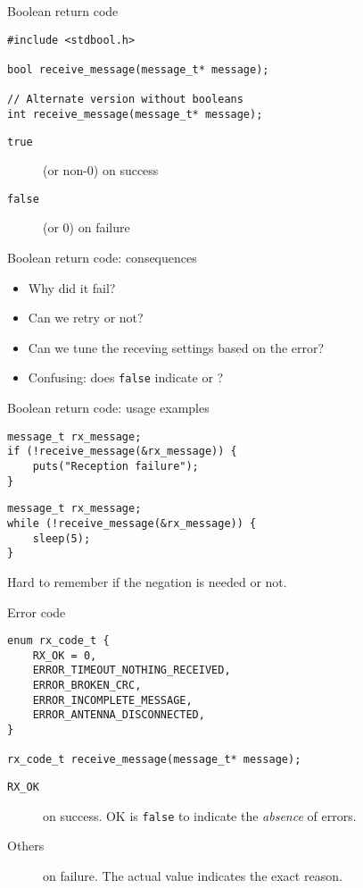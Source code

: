 \documentclass[aspectratio=169,14pt]{beamer}
\begin{document}
\begin{frame}[fragile]{Boolean return code}
\begin{lstlisting}[style=cstyle]
#include <stdbool.h>

bool receive_message(message_t* message);

// Alternate version without booleans
int receive_message(message_t* message);
\end{lstlisting}

\begin{description}
    \item[\texttt{true}] (or non-0) on success
    \item[\texttt{false}] (or 0) on failure
\end{description}
\end{frame}


\begin{frame}[fragile]{Boolean return code: consequences}
\begin{itemize}
    \item Why did it fail?
    \item Can we retry or not?
    \item Can we tune the receving settings based on the error?
    \item Confusing: does \texttt{false} indicate  or ?
\end{itemize}
\end{frame}


\begin{frame}[fragile]{Boolean return code: usage examples}
\begin{lstlisting}[style=cstyle]
message_t rx_message;
if (!receive_message(&rx_message)) {
    puts("Reception failure");
}
\end{lstlisting}

\begin{lstlisting}[style=cstyle]
message_t rx_message;
while (!receive_message(&rx_message)) {
    sleep(5);
}
\end{lstlisting}

Hard to remember if the negation is needed or not.
\end{frame}


\begin{frame}[fragile]{Error code}
\begin{lstlisting}[style=cstyle]
enum rx_code_t {
    RX_OK = 0,
    ERROR_TIMEOUT_NOTHING_RECEIVED,
    ERROR_BROKEN_CRC,
    ERROR_INCOMPLETE_MESSAGE,
    ERROR_ANTENNA_DISCONNECTED,
}

rx_code_t receive_message(message_t* message);
\end{lstlisting}

\begin{description}
    \item[\texttt{RX\_OK}] on success. OK is \texttt{false} to indicate the \textit{absence} of errors.
    \item[Others] on failure. The actual value indicates the exact reason.
\end{description}
\end{frame}
\end{document}
